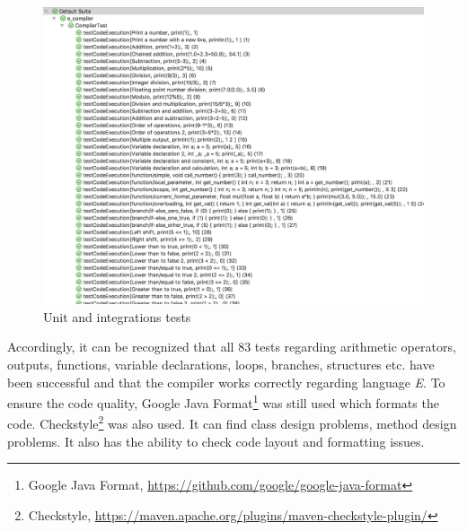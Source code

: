 \begin{figure}[bth]
	\centering
	\includegraphics[scale=0.32]{./img/tests}
	\caption[Unit and integrations tests]{Unit and integrations tests}
	\label{fig:tests}
\end{figure}
\noindent

Accordingly, it can be recognized that all 83 tests regarding arithmetic operators, outputs, functions, variable declarations, loops, branches, structures etc. have been successful and that the compiler works correctly regarding language \emph{E}. To ensure the code quality, Google Java Format\footnote{Google Java Format, \url{https://github.com/google/google-java-format}} was still used which formats the code. Checkstyle\footnote{Checkstyle, \url{https://maven.apache.org/plugins/maven-checkstyle-plugin/}} was also used. It can find class design problems, method design problems. It also has the ability to check code layout and formatting issues.